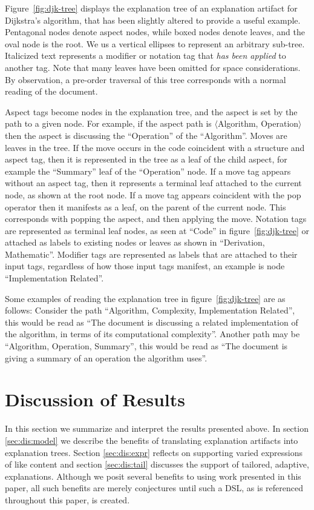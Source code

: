 \documentclass[sigconf]{acmart}
\newcommand{\brackets}[1]{$\langle$\ignorespaces#1\unskip$\rangle$}
\begin{document}
Figure~\ref{fig:djk-tree} displays the explanation tree of an explanation
artifact for Dijkstra's algorithm, that has been slightly altered to provide a
useful example. Pentagonal nodes denote aspect nodes, while boxed nodes denote
leaves, and the oval node is the root. We us a vertical ellipses to represent an
arbitrary sub-tree. Italicized text represents a modifier or notation tag that
\emph{has been applied} to another tag. Note that many leaves have been omitted
for space considerations. By observation, a pre-order traversal of this tree
corresponds with a normal reading of the document.

Aspect tags become nodes in the explanation tree, and the aspect is set by the
path to a given node. For example, if the aspect path is \brackets{Algorithm,
  Operation} then the aspect is discussing the ``Operation'' of the
``Algorithm''. Moves are leaves in the tree. If the move occurs in the code
coincident with a structure and aspect tag, then it is represented in the tree
as a leaf of the child aspect, for example the ``Summary'' leaf of the
``Operation'' node. If a move tag appears without an aspect tag, then it
represents a terminal leaf attached to the current node, as shown at the root
node. If a move tag appears coincident with the pop operator then it manifests
as a leaf, on the parent of the current node. This corresponds with popping the
aspect, and then applying the move. Notation tags are represented as terminal
leaf nodes, as seen at ``Code'' in figure~\ref{fig:djk-tree} or attached as
labels to existing nodes or leaves as shown in ``Derivation, Mathematic''.
Modifier tags are represented as labels that are attached to their input tags,
regardless of how those input tags manifest, an example is node ``Implementation
Related''.

Some examples of reading the explanation tree in figure~\ref{fig:djk-tree} are
as follows: Consider the path ``Algorithm, Complexity, Implementation Related'',
this would be read as ``The document is discussing a related implementation of
the algorithm, in terms of its computational complexity''. Another path may be
``Algorithm, Operation, Summary'', this would be read as ``The document is
giving a summary of an operation the algorithm uses''.

\section{Discussion of Results}
\label{sec:dis}
In this section we summarize and interpret the results presented above. In
section \ref{sec:dis:model} we describe the benefits of translating explanation
artifacts into explanation trees. Section \ref{sec:dis:expr} reflects on
supporting varied expressions of like content and section \ref{sec:dis:tail}
discusses the support of tailored, adaptive, explanations. Although we posit
several benefits to using work presented in this paper, all such benefits are
merely conjectures until such a DSL, as is referenced throughout this paper, is
created. 
\end{document}
